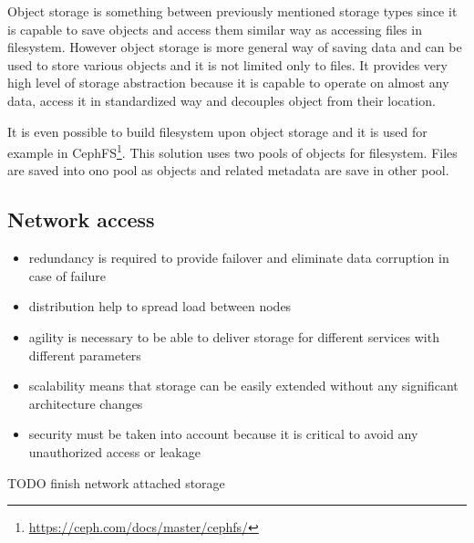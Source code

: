 Object storage is something between previously mentioned storage types since it is capable to save objects and access them similar way as accessing files in filesystem. However object storage is more general way of saving data and can be used to store various objects and it is not limited only to files. It provides very high level of storage abstraction because it is capable to operate on almost any data, access it in standardized way and decouples object from their location.
\label{par:object-storage}

It is even possible to build filesystem upon object storage and it is used for example in CephFS\footnote{\url{https://ceph.com/docs/master/cephfs/}}. This solution uses two pools of objects for  filesystem. Files are saved into ono pool as objects and related metadata are save in other pool. 

\subsection{Network access}
\begin{itemize}
	\item redundancy is required to provide failover and eliminate data corruption in case of failure 
	\item distribution help to spread load between nodes
	\item agility is necessary to be able to deliver storage for different services with different parameters
	\item scalability means that storage can be easily extended without any significant architecture changes
	\item security must be taken into account because it is critical to avoid any unauthorized access or leakage
\end{itemize}

\label{par:storage-network}
% 

TODO finish network attached storage





